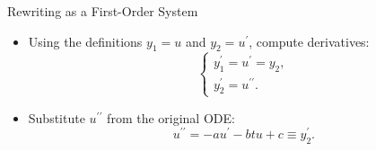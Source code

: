 \documentclass[10pt]{beamer}
\begin{document}
\begin{frame}{Rewriting as a First-Order System}
\begin{itemize}
    \item Using the definitions \(y_1 = u\) and \(y_2 = u^\prime\), compute derivatives:
    \[
    \begin{cases}
    y_1^\prime = u^\prime = y_2, \\
    y_2^\prime = u^{\prime\prime}.
    \end{cases}
    \]

    \item Substitute \(u^{\prime\prime}\) from the original ODE:
    \[
    u^{\prime\prime} = -a u^\prime - b t u + c \equiv y_2^{\prime}.
    \]




\end{itemize}
\end{frame}
\end{document}
